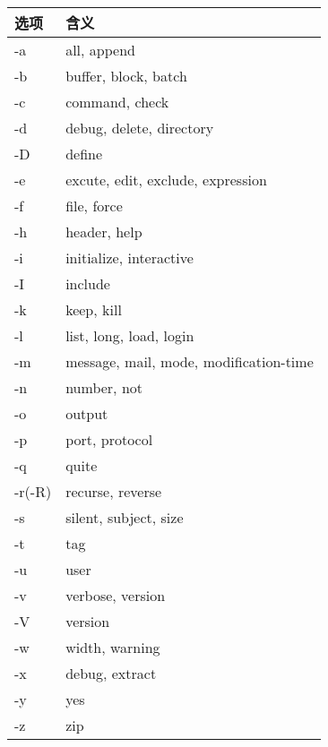 \documentclass[bigger]{beamer}
\begin{document}
\begin{frame}[fragile]
\begin{itemize}
\begin{itemize}
\begin{enumerate}
\begin{itemize}
\begin{itemize}
\begin{center}
\begin{tabular}{ll}
 选项    &  含义                                    \\
\hline
 -a      &  all, append                             \\
 -b      &  buffer, block, batch                    \\
 -c      &  command, check                          \\
 -d      &  debug, delete, directory                \\
 -D      &  define                                  \\
 -e      &  excute, edit, exclude, expression       \\
 -f      &  file, force                             \\
 -h      &  header, help                            \\
 -i      &  initialize, interactive                 \\
 -I      &  include                                 \\
 -k      &  keep, kill                              \\
 -l      &  list, long, load, login                 \\
 -m      &  message, mail, mode, modification-time  \\
 -n      &  number, not                             \\
 -o      &  output                                  \\
 -p      &  port, protocol                          \\
 -q      &  quite                                   \\
 -r(-R)  &  recurse, reverse                        \\
 -s      &  silent, subject, size                   \\
 -t      &  tag                                     \\
 -u      &  user                                    \\
 -v      &  verbose, version                        \\
 -V      &  version                                 \\
 -w      &  width, warning                          \\
 -x      &  debug, extract                          \\
 -y      &  yes                                     \\
 -z      &  zip                                     \\
\end{tabular}
\end{center}



\end{itemize}
\end{itemize}
\end{enumerate}
\end{itemize}
\end{itemize}
\end{frame}
\end{document}
